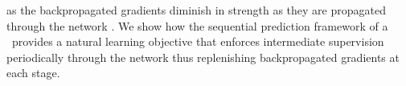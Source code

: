 \documentclass[10pt,twocolumn,letterpaper]{article}
\begin{document}
as the backpropagated gradients diminish in strength as they are propagated through the network \cite{bradley2010learning,glorot2010understanding}. We show how the sequential prediction framework of a \posemachine~provides a natural learning objective that enforces intermediate supervision periodically through the network thus replenishing backpropagated gradients at each stage.%
\end{document}
